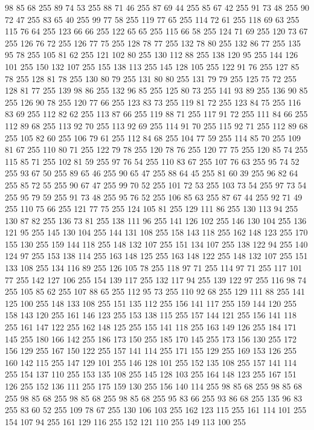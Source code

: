 98 85 68 255 89 74 53 255 88 71 46 255 87 69 44 255 85 67 42 255 91 73 48 255 90 72 47 255 83 65 40 255 99 77 58 255 119 77 65 255 114 72 61 255 118 69 63 255 115 76 64 255 123 66 66 255 122 65 65 255 115 66 58 255 124 71 69 255 120 73 67 255 126 76 72 255 126 77 75 255 128 78 77 255 132 78 80 255 132 86 77 255 135 95 78 255 105 81 62 255 121 102 80 255 130 112 88 255 138 120 95 255 144 126 101 255 150 132 107 255 155 138 113 255 145 128 105 255 122 91 76 255 127 85 78 255 128 81 78 255 130 80 79 255 131 80 80 255 131 79 79 255 125 75 72 255 128 81 77 255 139 98 86 255 132 96 85 255 125 80 73 255 141 93 89 255 136 90 85 255 126 90 78 255 120 77 66 255 123 83 73 255 119 81 72 255 123 84 75 255 116 83 69 255 112 82 62 255 113 87 66 255 119 88 71 255 117 91 72 255 111 84 66 255 112 89 68 255 113 92 70 255 113 92 69 255 114 91 70 255 115 92 71 255 112 89 68 255 105 82 60 255 106 79 61 255
112 84 68 255 104 77 59 255 114 85 70 255 109 81 67 255 110 80 71 255 122 79 78 255 120 78 76 255 120 77 75 255 120 85 74 255 115 85 71 255 102 81 59 255 97 76 54 255 110 83 67 255 107 76 63 255 95 74 52 255 93 67 50 255 89 65 46 255 90 65 47 255 88 64 45 255 81 60 39 255 96 82 64 255 85 72 55 255 90 67 47 255 99 70 52 255 101 72 53 255 103 73 54 255 97 73 54 255 95 79 59 255 91 73 48 255 95 76 52 255 106 85 63 255 87 67 44 255 92 71 49 255 110 75 66 255 121 77 75 255 124 105 81 255 129 111 86 255 130 113 94 255 130 87 82 255 136 73 81 255 138 111 96 255 141 126 102 255 146 130 104 255 136 121 95 255 145 130 104 255 144 131 108 255 158 143 118 255 162 148 123 255 170 155 130 255 159 144 118 255 148 132 107 255 151 134 107 255 138 122 94 255 140 124 97 255 153 138 114 255 163 148 125 255 163 148 122 255 148 132 107 255 151 133 108 255 134 116 89 255 126 105 78 255 118 97 71 255 114 97 71 255 117 101 77 255
142 127 106 255 154 139 117 255 132 117 94 255 139 122 97 255 116 98 74 255 105 85 62 255 107 88 65 255 112 95 73 255 110 92 68 255 129 111 88 255 141 125 100 255 148 133 108 255 151 135 112 255 156 141 117 255 159 144 120 255 158 143 120 255 161 146 123 255 153 138 115 255 157 144 121 255 156 141 118 255 161 147 122 255 162 148 125 255 155 141 118 255 163 149 126 255 184 171 145 255 180 166 142 255 186 173 150 255 185 170 145 255 173 156 130 255 172 156 129 255 167 150 122 255 157 141 114 255 171 155 129 255 169 153 126 255 160 142 115 255 147 129 101 255 146 128 101 255 152 135 108 255 157 141 114 255 154 137 110 255 153 135 108 255 145 128 103 255 164 148 123 255 167 151 126 255 152 136 111 255 175 159 130 255 156 140 114 255 98 85 68 255 98 85 68 255 98 85 68 255 98 85 68 255 98 85 68 255 95 83 66 255 93 86 68 255 135 96 83 255 83 60 52 255 109 78 67 255 130 106 103 255 162 123 115 255 161 114 101 255 154 107 94 255 161 129 116 255 152 121 110 255 149 113 100 255
